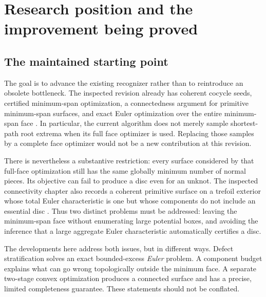 \documentclass[11pt,letterpaper]{article}
\theoremstyle{definition}
\begin{document}
\begin{titlepage}
\begin{abstract}
The package includes independently replayed arithmetic certificates, 66 passing test methods, exhaustive finite oracles, 1,200 literal normal-surface gluings, constructed solid-torus move histories, and paired benchmarks. It does not establish a complete quasi-polynomial recognizer: arbitrary knot inputs are not proved to admit a suitably bounded-excess coherent disc, and aggregate Euler optimization is not generally disc-existence optimization.
\end{abstract}
\end{titlepage}

\begingroup\footnotesize\setlength{\parskip}{0pt}\renewcommand{\baselinestretch}{0.94}\selectfont\tableofcontents\endgroup
\clearpage

\section{Research position and the improvement being proved}\label{sec:position}

\subsection{The maintained starting point}
The goal is to advance the existing recognizer rather than to reintroduce an obsolete bottleneck. The inspected revision already has coherent cocycle seeds, certified minimum-span optimization, a connectedness argument for primitive minimum-span surfaces, and exact Euler optimization over the entire minimum-span face \cite{repo,face,euler,connectivity}. In particular, the current algorithm does not merely sample shortest-path root extrema when its full face optimizer is used. Replacing those samples by a complete face optimizer would not be a new contribution at this revision.

There is nevertheless a substantive restriction: every surface considered by that full-face optimization still has the same globally minimum number of normal pieces. Its objective can fail to produce a disc even for an unknot. The inspected connectivity chapter also records a coherent primitive surface on a trefoil exterior whose total Euler characteristic is one but whose components do not include an essential disc \cite{connectivity}. Thus two distinct problems must be addressed: leaving the minimum-span face without enumerating large potential boxes, and avoiding the inference that a large aggregate Euler characteristic automatically certifies a disc.

The developments here address both issues, but in different ways. Defect stratification solves an exact bounded-excess \emph{Euler} problem. A component budget explains what can go wrong topologically outside the minimum face. A separate two-stage convex optimization produces a connected surface and has a precise, limited completeness guarantee. These statements should not be conflated.
\end{document}
